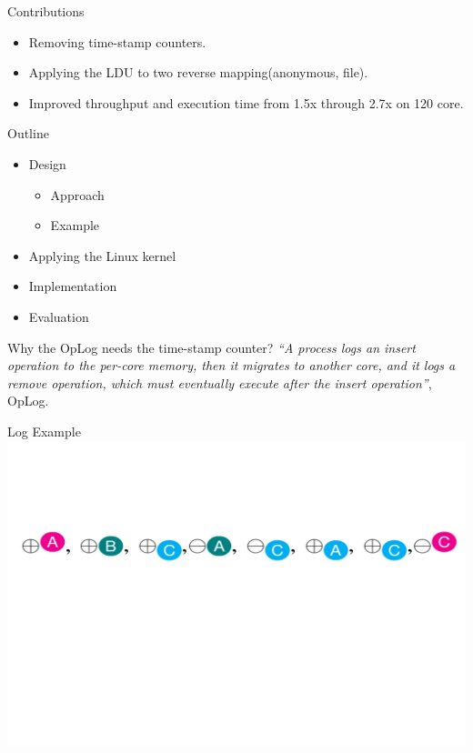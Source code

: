 \documentclass[english]{beamer} %
\begin{document}
\begin{frame}{Contributions}
    \begin{itemize}[<+-| alert@+>]
	\item Removing time-stamp counters.
	\item Applying the LDU to two reverse mapping(anonymous, file).
	\item Improved throughput and execution time from 1.5x through 2.7x
	on 120 core.
	\end{itemize}
\end{frame}


\begin{frame}{Outline}
	\begin{itemize}
	\item Design
	\begin{itemize}
	\item Approach
	\item Example 
	\end{itemize}
	\item Applying the Linux kernel
	\item Implementation
	\item Evaluation
	\end{itemize}
\end{frame}



\begin{frame}{Why the OpLog needs the time-stamp counter?}
\textit{``A process logs an insert operation to the per-core memory, then
it migrates to another core, and it logs a remove operation, which must
eventually execute after the insert operation''}, OpLog.
\end{frame}



\begin{frame}{Log Example}
\includegraphics[scale=0.5]{fig/example_1}
\end{frame}
\end{document}
